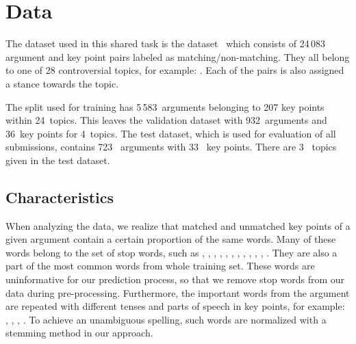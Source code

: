 \section{Data}\label{data}

The dataset used in this shared task is the \ArgKP dataset~\cite{Bar-HaimEFKLS2020} which consists of 24\,083 argument and key point pairs labeled as matching/non-matching. They all belong to one of 28 controversial topics, for example: . Each of the pairs is also assigned a stance towards the topic. 

The split used for training has 5\,583~arguments belonging to 207 key points within 24~topics. This leaves the 
validation dataset with 932~arguments and 36~key points for 4~topics. The test dataset, which is used for evaluation of all submissions, contains 723~ arguments with 33~ key points. There are 3~ topics given in the test dataset.

\subsection{Characteristics}


When analyzing the data, we realize that matched and unmatched key points of a given argument contain a certain proportion of the same words. 
Many of these words belong to the set of stop words, such as , , , , , , , , , , , .
They are also a part of the most common words from whole training set.
These words are uninformative for our prediction process, so that we remove stop words from our data during pre-processing. 
Furthermore, the important words from the argument are repeated with different tenses and parts of speech in key points, for example: , , , . 
To achieve an unambiguous spelling, such words are normalized with a stemming method in our approach. 

